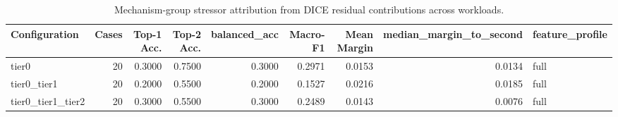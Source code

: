 \begin{table}[t]
\centering
\caption{Mechanism-group stressor attribution from DICE residual contributions across workloads.}
\label{tab:dice_stressor_diagnosis}
\footnotesize
\begin{tabular}{lrrrrrrrl}
\toprule
Configuration & Cases & Top-1 Acc. & Top-2 Acc. & balanced_acc & Macro-F1 & Mean Margin & median_margin_to_second & feature_profile \\
\midrule
tier0 & 20 & 0.3000 & 0.7500 & 0.3000 & 0.2971 & 0.0153 & 0.0134 & full \\
tier0_tier1 & 20 & 0.2000 & 0.5500 & 0.2000 & 0.1527 & 0.0216 & 0.0185 & full \\
tier0_tier1_tier2 & 20 & 0.3000 & 0.5500 & 0.3000 & 0.2489 & 0.0143 & 0.0076 & full \\
\bottomrule
\end{tabular}

\end{table}
